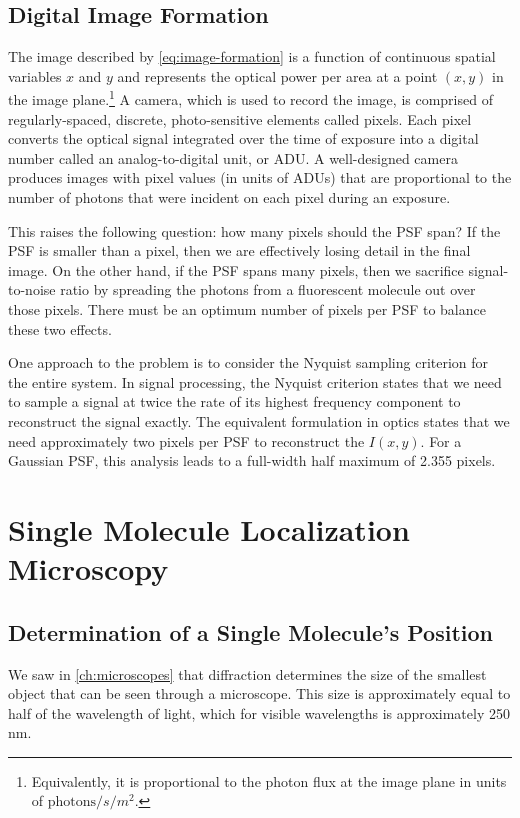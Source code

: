 \documentclass[10pt,a4paper]{book}
\begin{document}
\section{Digital Image Formation}

The image described by \autoref{eq:image-formation} is a function of continuous spatial variables $x$ and $y$ and represents the optical power per area at a point $\left(x, y\right)$ in the image plane.\footnote{Equivalently, it is proportional to the photon flux at the image plane in units of $\text{photons} / s / m^2$.} A camera, which is used to record the image, is comprised of regularly-spaced, discrete, photo-sensitive elements called pixels. Each pixel converts the optical signal integrated over the time of exposure into a digital number called an analog-to-digital unit, or ADU. A well-designed camera produces images with pixel values (in units of ADUs) that are proportional to the number of photons that were incident on each pixel during an exposure.

This raises the following question: how many pixels should the PSF span? If the PSF is smaller than a pixel, then we are effectively losing detail in the final image. On the other hand, if the PSF spans many pixels, then we sacrifice signal-to-noise ratio by spreading the photons from a fluorescent molecule out over those pixels. There must be an optimum number of pixels per PSF to balance these two effects.

One approach to the problem is to consider the Nyquist sampling criterion for the entire system. In signal processing, the Nyquist criterion states that we need to sample a signal at twice the rate of its highest frequency component to reconstruct the signal exactly. The equivalent formulation in optics states that we need approximately two pixels per PSF to reconstruct the $I \left(x, y\right)$. For a Gaussian PSF, this analysis leads to a full-width half maximum of 2.355 pixels.

\chapter{Single Molecule Localization Microscopy}

\section{Determination of a Single Molecule's Position}

We saw in \autoref{ch:microscopes} that diffraction determines the size of the smallest object that can be seen through a microscope. This size is approximately equal to half of the wavelength of light, which for visible wavelengths is approximately 250 nm.
\end{document}
